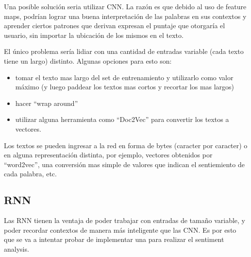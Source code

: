 Una posible soluci\'on seria utilizar CNN. La raz\'on es que debido al uso de feature maps, podr\'ian
lograr una buena interpretaci\'on de las palabras en sus contextos y aprender ciertos patrones que
derivan expresan el puntaje que otorgar\'ia el usuario, sin importar la ubicaci\'on de los mismos
en el texto.

El \'unico problema ser\'ia lidiar con una cantidad de entradas variable (cada texto tiene un largo)
distinto. Algunas opciones para esto son:

\begin{itemize}
\setlength\itemsep{0em}
   \item tomar el texto mas largo del set de entrenamiento y utilizarlo como valor m\'aximo (y luego
         paddear los textos mas cortos y recortar los mas largos)
   \item hacer ``wrap around''
   \item utilizar alguna herramienta como ``Doc2Vec'' para convertir los textos a vectores. \cite{doc2vec}
\end{itemize}

Los textos se pueden ingresar a la red en forma de bytes (caracter por caracter) o en alguna
representaci\'on distinta, por ejemplo, vectores obtenidos por ``word2vec'', una conversi\'on mas
simple de valores que indican el sentiemiento de cada palabra, etc. \cite{CNN_for_nlp}


\subsection{RNN}

Las RNN tienen la ventaja de poder trabajar con entradas de tama\~no variable, y poder recordar
contextos de manera m\'as inteligente que las CNN. Es por esto que se va a intentar probar de
implementar una para realizar el sentiment analysis. \cite{LSTM_sentiment_analysis}
